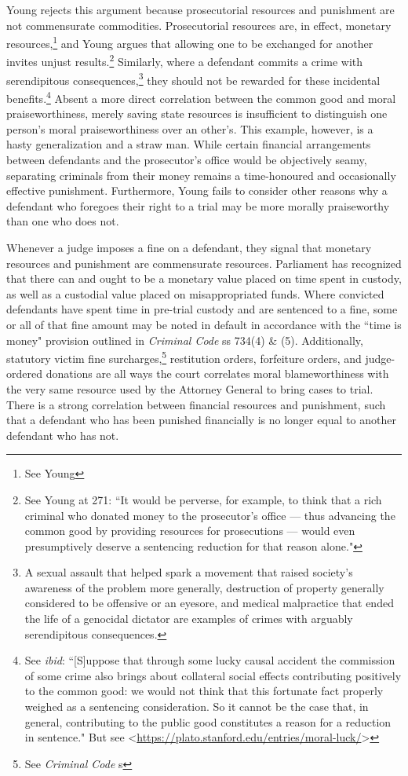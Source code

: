 Young rejects this argument because prosecutorial resources and punishment are not commensurate commodities. Prosecutorial resources are, in effect, monetary resources,\footnote{See Young} and Young argues that allowing one to be exchanged for another invites unjust results.\footnote{See Young at 271: ``It would be perverse, for example, to think that a rich criminal who donated money to the prosecutor's office — thus advancing the common good by providing resources for prosecutions — would even presumptively deserve a sentencing reduction for that reason alone."} Similarly, where a defendant commits a crime with serendipitous consequences,\footnote{A sexual assault that helped spark a movement that raised society's awareness of the problem more generally, destruction of property generally considered to be offensive or an eyesore, and medical malpractice that ended the life of a genocidal dictator are examples of crimes with arguably serendipitous consequences.} they should not be rewarded for these incidental benefits.\footnote{See \textit{ibid}: ``[S]uppose that through some lucky causal accident the commission of some crime also brings about collateral social effects contributing positively to the common good: we would not think that this fortunate fact properly weighed as a sentencing consideration. So it cannot be the case that, in general, contributing to the public good constitutes a reason for a reduction in sentence." But see \textless \url{https://plato.stanford.edu/entries/moral-luck/}\textgreater} Absent a more direct correlation between the common good and moral praiseworthiness, merely saving state resources is insufficient to distinguish one person's moral praiseworthiness over an other's. This example, however, is a hasty generalization and a straw man. While certain financial arrangements between defendants and the prosecutor's office would be objectively seamy, separating criminals from their money remains a time-honoured and occasionally effective punishment. Furthermore, Young fails to consider other reasons why a defendant who foregoes their right to a trial may be more morally praiseworthy than one who does not.

Whenever a judge imposes a fine on a defendant, they signal that monetary resources and punishment are commensurate resources. Parliament has recognized that there can and ought to be a monetary value placed on time spent in custody, as well as a custodial value placed on misappropriated funds. Where convicted defendants have spent time in pre-trial custody and are sentenced to a fine, some or all of that fine amount may be noted in default in accordance with the ``time is money" provision outlined in \textit{Criminal Code} ss 734(4) \& (5). Additionally, statutory victim fine surcharges,\footnote{See \textit{Criminal Code} s } restitution orders, forfeiture orders, and judge-ordered donations are all ways the court correlates moral blameworthiness with the very same resource used by the Attorney General to bring cases to trial. There is a strong correlation between financial resources and punishment, such that a defendant who has been punished financially is no longer equal to another defendant who has not.

